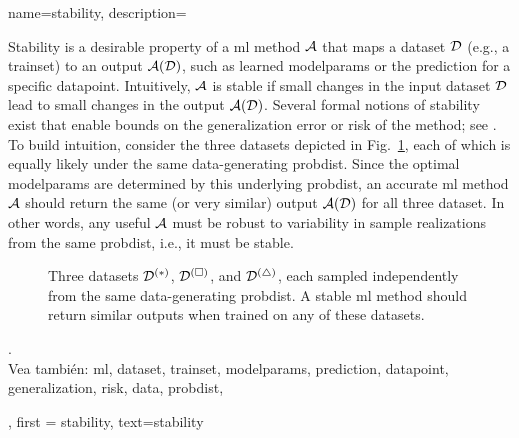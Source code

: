 	 
{name={stability},
	description={
		Stability is a desirable property of a \gls{ml} method $\mathcal{A}$ that maps a 
		\gls{dataset} $\mathcal{D}$ (e.g., a \gls{trainset}) to an output $\mathcal{A}(\mathcal{D})$, such as learned 
		\gls{modelparams} or the \gls{prediction} for a specific \gls{datapoint}. Intuitively, $\mathcal{A}$ is 
		stable if small changes in the input \gls{dataset} $\mathcal{D}$ lead to small changes in the 
		output $\mathcal{A}(\mathcal{D})$. Several formal notions of stability exist that enable bounds 
		on the \gls{generalization} error or \gls{risk} of the method; see \cite[Ch.~13]{ShalevMLBook}.
		To build intuition, consider the three datasets depicted in Fig.~\ref{fig_three_data_stability}, each 
		of which is equally likely under the same \gls{data}-generating \gls{probdist}. Since the 
		optimal \gls{modelparams} are determined by this underlying \gls{probdist}, an accurate 
		\gls{ml} method $\mathcal{A}$ should return the same (or very similar) output $\mathcal{A}(\mathcal{D})$ 
		for all three \gls{dataset}. In other words, any useful $\mathcal{A}$ must be robust to 
		variability in sample \gls{realization}s from the same \gls{probdist}, i.e., it must be stable. 
		\begin{figure}[H]
			\centering
			\caption{Three \gls{dataset}s $\mathcal{D}^{(*)}$, $\mathcal{D}^{(\square)}$, and $\mathcal{D}^{(\triangle)}$, 
				each sampled independently from the same \gls{data}-generating \gls{probdist}. A stable \gls{ml} 
				method should return similar outputs when trained on any of these \gls{dataset}s. \label{fig_three_data_stability}}
		\end{figure}.
		\\
		Vea también: \gls{ml}, \gls{dataset}, \gls{trainset}, \gls{modelparams}, \gls{prediction}, \gls{datapoint}, \gls{generalization}, \gls{risk}, \gls{data}, \gls{probdist},   }, 
	first = {stability}, text={stability} 
}

